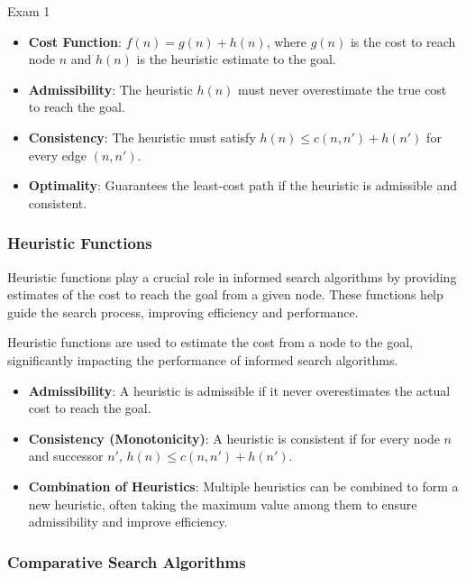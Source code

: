 \begin{examnotes}{Exam 1}
\begin{highlight}[A* Search]
        \begin{itemize}
            \item \textbf{Cost Function}: $f(n) = g(n) + h(n)$, where $g(n)$ is the cost to reach node $n$ and $h(n)$ is the heuristic estimate to the goal.
            \item \textbf{Admissibility}: The heuristic $h(n)$ must never overestimate the true cost to reach the goal.
            \item \textbf{Consistency}: The heuristic must satisfy $h(n) \leq c(n, n') + h(n')$ for every edge $(n, n')$.
            \item \textbf{Optimality}: Guarantees the least-cost path if the heuristic is admissible and consistent.
        \end{itemize}
    \end{highlight}
    
    \subsubsection*{Heuristic Functions}
    
    Heuristic functions play a crucial role in informed search algorithms by providing estimates of the cost to reach the goal from a given node. These functions help guide the search process, improving 
    efficiency and performance.
    
    \begin{highlight}
        Heuristic functions are used to estimate the cost from a node to the goal, significantly impacting the performance of informed search algorithms.
        
        \begin{itemize}
            \item \textbf{Admissibility}: A heuristic is admissible if it never overestimates the actual cost to reach the goal.
            \item \textbf{Consistency (Monotonicity)}: A heuristic is consistent if for every node $n$ and successor $n'$, $h(n) \leq c(n, n') + h(n')$.
            \item \textbf{Combination of Heuristics}: Multiple heuristics can be combined to form a new heuristic, often taking the maximum value among them to ensure admissibility and improve efficiency.
        \end{itemize}
    \end{highlight}
    
    \subsubsection*{Comparative Search Algorithms}
    

\end{examnotes}
